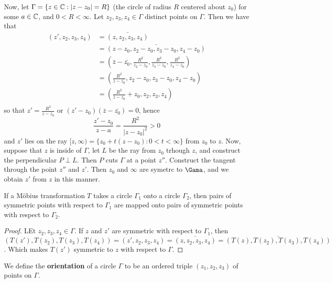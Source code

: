 \begin{example}
    Now, let $\Gamma=\{z \in \mathbb{C} : |z-z_0|=R\}$ (the circle of radius $R$
   centered about  $z_0$) for some $a \in \mathbb{C}$, and $0<R<\infty$. Let $z_2,z_3,z_4
    \in \Gamma$ distinct points on $\Gamma$. Then we have that
    \begin{align*}
        (z',z_2,z_3,z_4)    &=  \bar{(z,z_2,z_3,z_4)}   \\
                            &=  \bar{(z-z_0,z_2-z_0,z_3-z_0,z_4-z_0)}   \\
                            &= (\bar{z}-\bar{z_0},\frac{R^2}{z_2-z_0},
                                    \frac{R^2}{z_3-z_0},\frac{R^2}{z_4-z_0}) \\
                            &=(\frac{R^2}{\bar{z}-\bar{z_0}},z_2-z_0,z_3-z_0,z_4-z_0) \\
                            &=(\frac{R^2}{\bar{z}-\bar{z_0}}+z_0,z_2,z_3,z_4) \\
    \end{align*}
    so that $z'=\frac{R^2}{z-z_0}$ or $(z'-z_0)(\bar{z}-\bar{z_0})=0$, hence
    \begin{equation*}
        \frac{z'-z_0}{z-a}=\frac{R^2}{|z-z_0|^2}>0
    \end{equation*}
    and $z'$ lies on the ray  $[z,\infty)=\{z_0+t(z-z_0) : 0<t<\infty\}$ from
    $z_0$ to $z$. Now, suppose that  $z$ is inside of  $\Gamma$, let  $L$ be the
    ray from  $z_0$ trhough $z$, and construct the perpendicular  $P \perp L$.
    Then $P$ cuts  $\Gamma$ at a point $z''$. Construct the tangent through
    the point $z''$ and $z'$. Then  $z_0$ and $\infty$ are symetrc to  $\Gama$,
    and we obtain  $z'$ from  $z$ in this manner.
\end{example}

\begin{theorem}\label{3.3.10}
    If a M\"obius transformation $T$ takes a circle  $\Gamma_1$ onto a circle
    $\Gamma_2$, then pairs of symmetric points with respect to $\Gamma_1$ are
    mapped onto pairs of symmetric points with respect to $\Gamma_2$.
\end{theorem}
\begin{proof}
    LEt $z_2,z_3,z_4 \in \Gamma$. If $z$ and  $z'$ are symmetric with respect to
     $\Gamma_1$, then
     $(T(z'),T(z_2),T(z_3),T(z_4))=(z',z_2,z_3,z_4)=\bar{(z,z_2,z_3,z_4)}=
     \bar{(T(z),T(z_2),T(z_3),T(z_4))}$. Which makes $T(z')$ symmetric to $z$
     with respect to  $\Gamma$.
\end{proof}

\begin{definition}
    We define the \textbf{orientation} of a circle $\Gamma$ to be an ordered
    triple $(z_1,z_2,z_3)$ of points on $\Gamma$.
\end{definition}

